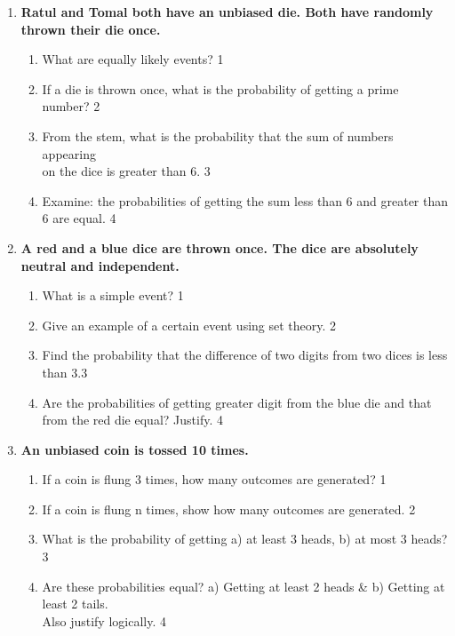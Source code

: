 \documentclass[a4paper,oneside, margin=1.4in]{book}
\begin{document}
\begin{enumerate}
  
       \item
	  \textbf{Ratul and Tomal both have an unbiased die. Both have randomly thrown
	  their die once. } 
  
  \begin{enumerate}
    \item
	What are equally likely events? \hfill 1
    \item
	If a die is thrown once, what is the probability of getting a prime 
	number? \hfill 2
    \item  
	From the stem, what is the probability that the sum of numbers appearing
	\\ on the dice is greater than 6. \hfill 3
    \item
	Examine: the probabilities of getting the sum less than 6 and greater 
	than 6 are equal. \hfill 4
  \end{enumerate}

 \item
	  \textbf{A red and a blue dice are thrown once. The dice are absolutely neutral and independent.} 
  
  \begin{enumerate}
    \item
	What is a simple event? \hfill 1
    \item
	Give an example of a certain event using set theory. \hfill 2
    \item  
	Find the probability that the difference of two digits from two dices is less than 3.\hfill 3
    \item
	Are the probabilities of getting greater digit from the blue die and that from the red die equal? Justify. \hfill 4
  \end{enumerate}
  
  \item
	  \textbf{An unbiased coin is tossed 10 times.} 
  
  \begin{enumerate}
    \item
	If a coin is flung 3 times, how many outcomes are generated? \hfill 1
    \item
	If a coin is flung n times, show how many outcomes are generated. \hfill 2
    \item  
	What is the probability of getting a) at least 3 heads, b) at most 3 heads? \hfill 3
    \item
	Are these probabilities equal? a) Getting at least 2 heads \& b) Getting at least 2 tails. \\ Also justify logically. \hfill 4
  \end{enumerate}
  

\end{enumerate}
\end{document}
